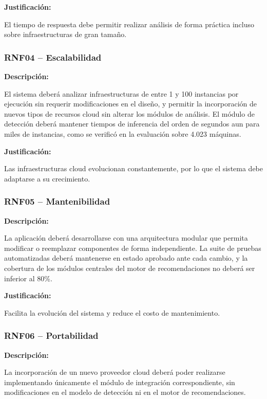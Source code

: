\noindent \textbf{Justificación:}

El tiempo de respuesta debe permitir realizar análisis de forma práctica incluso sobre infraestructuras de gran tamaño.

\subsubsection{RNF04 -- Escalabilidad}

\noindent \textbf{Descripción:}

El sistema deberá analizar infraestructuras de entre 1 y 100 instancias por ejecución sin requerir modificaciones en el diseño, y permitir la incorporación de nuevos tipos de recursos cloud sin alterar los módulos de análisis. El módulo de detección deberá mantener tiempos de inferencia del orden de segundos aun para miles de instancias, como se verificó en la evaluación sobre 4.023 máquinas.

\noindent \textbf{Justificación:}

Las infraestructuras cloud evolucionan constantemente, por lo que el sistema debe adaptarse a su crecimiento.

\subsubsection{RNF05 -- Mantenibilidad}

\noindent \textbf{Descripción:}

La aplicación deberá desarrollarse con una arquitectura modular que permita modificar o reemplazar componentes de forma independiente. La suite de pruebas automatizadas deberá mantenerse en estado aprobado ante cada cambio, y la cobertura de los módulos centrales del motor de recomendaciones no deberá ser inferior al 80\%.

\noindent \textbf{Justificación:}

Facilita la evolución del sistema y reduce el costo de mantenimiento.

\subsubsection{RNF06 -- Portabilidad}

\noindent \textbf{Descripción:}

La incorporación de un nuevo proveedor cloud deberá poder realizarse implementando únicamente el módulo de integración correspondiente, sin modificaciones en el modelo de detección ni en el motor de recomendaciones.

